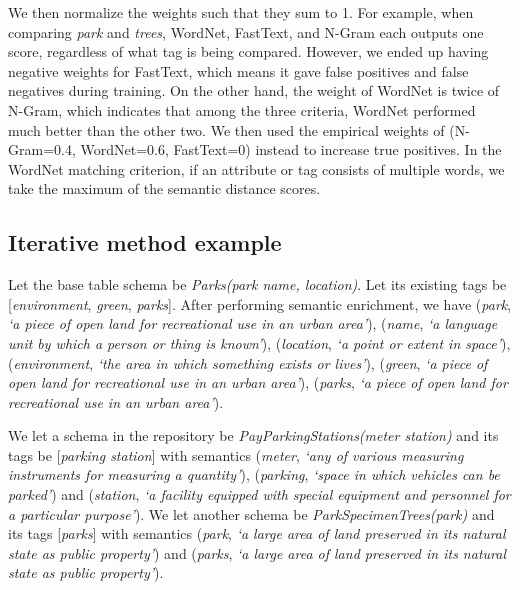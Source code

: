 We then normalize the weights such that they sum to 1. For example, when comparing \textit{park} and \textit{trees}, WordNet, FastText, and N-Gram each outputs one score, regardless of what tag is being compared. However, we ended up having negative weights for FastText, which means it gave false positives and false negatives during training. On the other hand, the weight of WordNet is twice of N-Gram, which indicates that among the three criteria, WordNet performed much better than the other two. We then used the empirical weights of (N-Gram=0.4, WordNet=0.6, FastText=0) instead to increase true positives. In the WordNet matching criterion, if an attribute or tag consists of multiple words, we take the maximum of the semantic distance scores.

\subsection{Iterative method example}
\label{ssec:IterativeMethodExample2}

Let the base table schema be \textit{Parks(park name, location)}. Let its existing tags be [\textit{environment}, \textit{green}, \textit{parks}]. After performing semantic enrichment, we have (\textit{park}, \textit{`a piece of open land for recreational use in an urban area'}), (\textit{name}, \textit{`a language unit by which a person or thing is known'}), (\textit{location}, \textit{`a point or extent in space'}), (\textit{environment}, \textit{`the area in which something exists or lives'}), (\textit{green}, \textit{`a piece of open land for recreational use in an urban area'}), (\textit{parks}, \textit{`a piece of open land for recreational use in an urban area'}).

We let a schema in the repository be \textit{PayParkingStations(meter station)} and its tags be [\textit{parking station}] with semantics (\textit{meter}, \textit{`any of various measuring instruments for measuring a quantity'}), (\textit{parking}, \textit{`space in which vehicles can be parked'}) and (\textit{station}, \textit{`a facility equipped with special equipment and personnel for a particular purpose'}). We let another schema be \textit{ParkSpecimenTrees(park)} and its tags [\textit{parks}] with semantics (\textit{park}, \textit{`a large area of land preserved in its natural state as public property'}) and (\textit{parks}, \textit{`a large area of land preserved in its natural state as public property'}).

